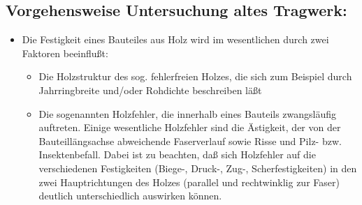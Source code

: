 \documentclass[fleqn,twoside]{article}
\begin{document}
    



    \subsection{Vorgehensweise Untersuchung altes Tragwerk:}
        \begin{itemize}
            \item Die Festigkeit eines Bauteiles aus Holz wird im wesentlichen durch zwei Faktoren beeinflußt:
                \begin{itemize}
                    \item Die Holzstruktur des sog. fehlerfreien Holzes, die sich zum Beispiel durch Jahrringbreite und/oder Rohdichte beschreiben läßt
                    \item Die sogenannten Holzfehler, die innerhalb eines Bauteils zwangsläufig auftreten. Einige wesentliche Holzfehler sind die Ästigkeit, der von der Bauteillängsachse abweichende Faserverlauf sowie Risse und Pilz- bzw. Insektenbefall. Dabei ist zu beachten, daß sich Holzfehler auf die verschiedenen Festigkeiten (Biege-, Druck-, Zug-, Scherfestigkeiten) in den zwei Hauptrichtungen des Holzes (parallel und rechtwinklig zur Faser) deutlich unterschiedlich auswirken können.
                \end{itemize}
        \end{itemize}
        
\end{document}
